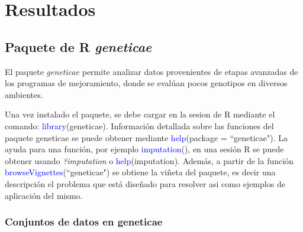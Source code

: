 

\chapter{Resultados}

\section{Paquete de R \emph{geneticae}}

El paquete \emph{geneticae} permite analizar datos provenientes de etapas avanzadas de los programas de mejoramiento, donde se evalúan pocos genotipos en diversos ambientes. 

Una vez instalado el paquete, se debe cargar en la sesion de R mediante el comando: \textcolor{blue}{library}(geneticae). Información detallada sobre las funciones del paquete geneticae se puede obtener mediante \textcolor{blue}{help}(package = ``geneticae"). La ayuda para una función, por ejemplo \textcolor{blue}{imputation}(), en una sesión R se puede obtener usando \emph{?imputation} o \textcolor{blue}{help}(imputation). Además, a partir de la función \textcolor{blue}{browseVignettes}(``geneticae") se obtiene la viñeta del paquete, es decir una descripción el problema que está diseñado para resolver asi como ejemplos de aplicación del mismo.

\subsection{Conjuntos de datos en geneticae}

